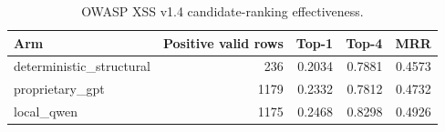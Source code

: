 \begin{table}[ht]
\centering
\caption{OWASP XSS v1.4 candidate-ranking effectiveness.}
\begin{tabular}{lrrrr}
\hline
Arm & Positive valid rows & Top-1 & Top-4 & MRR \\
\hline
deterministic\_structural & 236 & 0.2034 & 0.7881 & 0.4573 \\
proprietary\_gpt & 1179 & 0.2332 & 0.7812 & 0.4732 \\
local\_qwen & 1175 & 0.2468 & 0.8298 & 0.4926 \\
\hline
\end{tabular}
\end{table}
